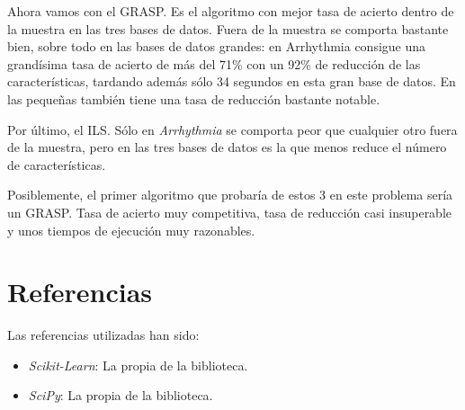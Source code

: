 \documentclass[a4paper, 11pt]{article}
\begin{document}
    Ahora vamos con el GRASP. Es el algoritmo con mejor tasa de acierto dentro de la muestra en las tres bases de datos. Fuera de la muestra se comporta bastante bien, sobre todo en las bases de datos grandes: en Arrhythmia consigue una grandísima tasa de acierto de más del 71\% con un 92\% de reducción de las características, tardando además sólo 34 segundos en esta gran base de datos. En las pequeñas también tiene una tasa de reducción bastante notable.

    Por último, el ILS. Sólo en \emph{Arrhythmia} se comporta peor que cualquier otro fuera de la muestra, pero en las tres bases de datos es la que menos reduce el número de características.

    Posiblemente, el primer algoritmo que probaría de estos 3 en este problema sería un GRASP. Tasa de acierto muy competitiva, tasa de reducción casi insuperable y unos tiempos de ejecución muy razonables.


  \section{Referencias}

  Las referencias utilizadas han sido:
  \begin{itemize}
    \item \emph{Scikit-Learn}: La propia  de la biblioteca.
    \item \emph{SciPy}: La propia  de la biblioteca.
  \end{itemize}
\end{document}
